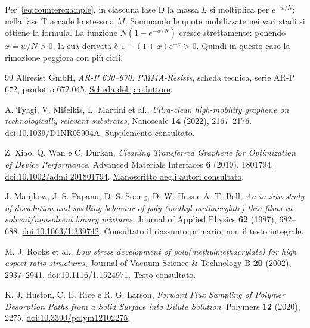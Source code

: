 \documentclass[11pt,reqno]{amsart}
\numberwithin{equation}{section}
\begin{document}
Per~\eqref{eq:counterexample}, in ciascuna fase D la massa
$L$ si moltiplica per $e^{-w/N}$; nella fase T accade
lo stesso a $M$. Sommando le quote mobilizzate nei vari
stadi si ottiene la formula. La funzione
$N(1-e^{-w/N})$ cresce strettamente: ponendo $x=w/N>0$,
la sua derivata \`e $1-(1+x)e^{-x}>0$.
Quindi in questo caso la rimozione peggiora con pi\`u cicli.


\begin{thebibliography}{99}
Allresist GmbH, \emph{AR-P 630--670: PMMA-Resists}, scheda tecnica,
serie AR-P 672, prodotto 672.045.
\href{https://www.allresist.de/wp-content/uploads/2020/03/AR-P630-670_Deutsch_Allresist_Produktinformation.pdf}{Scheda del produttore}.

A. Tyagi, V. Mi\v{s}eikis, L. Martini et al.,
\emph{Ultra-clean high-mobility graphene on technologically relevant substrates},
Nanoscale \textbf{14} (2022), 2167--2176.
\href{https://doi.org/10.1039/D1NR05904A}{doi:10.1039/D1NR05904A}.
\href{https://www.rsc.org/suppdata/d1/nr/d1nr05904a/d1nr05904a1.pdf}{Supplemento consultato}.

Z. Xiao, Q. Wan e C. Durkan,
\emph{Cleaning Transferred Graphene for Optimization of Device Performance},
Advanced Materials Interfaces \textbf{6} (2019), 1801794.
\href{https://doi.org/10.1002/admi.201801794}{doi:10.1002/admi.201801794}.
\href{https://www.repository.cam.ac.uk/handle/1810/291256}{Manoscritto degli autori consultato}.

J. Manjkow, J. S. Papanu, D. S. Soong, D. W. Hess e A. T. Bell,
\emph{An in situ study of dissolution and swelling behavior of
poly-(methyl methacrylate) thin films in solvent/nonsolvent binary mixtures},
Journal of Applied Physics \textbf{62} (1987), 682--688.
\href{https://doi.org/10.1063/1.339742}{doi:10.1063/1.339742}.
Consultato il riassunto primario, non il testo integrale.

M. J. Rooks et al., \emph{Low stress development of poly(methylmethacrylate)
for high aspect ratio structures}, Journal of Vacuum Science \& Technology B
\textbf{20} (2002), 2937--2941.
\href{https://doi.org/10.1116/1.1524971}{doi:10.1116/1.1524971}.
\href{https://nano.yale.edu/sites/default/files/files/pmma_develop_ipa_water.pdf}{Testo consultato}.

K. J. Huston, C. E. Rice e R. G. Larson,
\emph{Forward Flux Sampling of Polymer Desorption Paths from a Solid Surface
into Dilute Solution}, Polymers \textbf{12} (2020), 2275.
\href{https://doi.org/10.3390/polym12102275}{doi:10.3390/polym12102275}.


\end{thebibliography}
\end{document}
